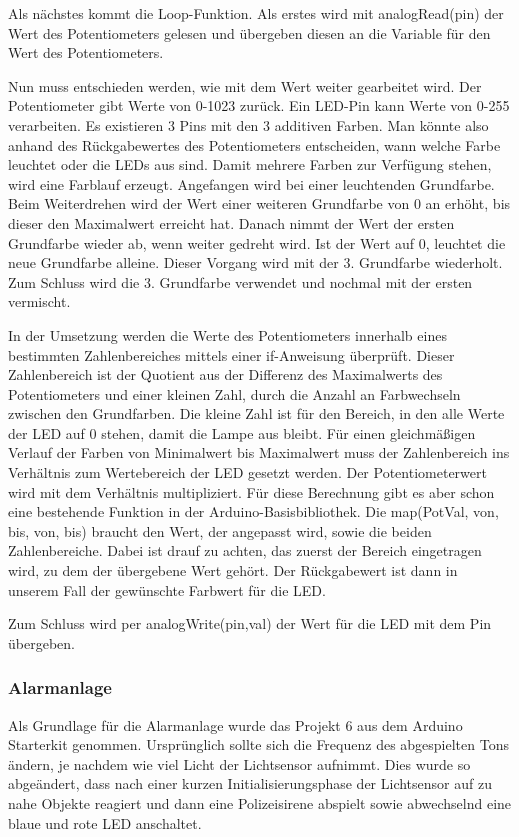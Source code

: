 Als nächstes kommt die Loop-Funktion. Als erstes wird mit analogRead(pin) der Wert des Potentiometers gelesen und übergeben diesen an die Variable für den Wert des Potentiometers.

Nun muss entschieden werden, wie mit dem Wert weiter gearbeitet wird. Der Potentiometer gibt Werte von 0-1023 zurück. Ein LED-Pin kann Werte von 0-255 verarbeiten. Es existieren 3 Pins mit den 3 additiven Farben. Man könnte also anhand des Rückgabewertes des Potentiometers entscheiden, wann welche Farbe leuchtet oder die LEDs aus sind. Damit mehrere Farben zur Verfügung stehen, wird eine Farblauf erzeugt. Angefangen wird bei einer leuchtenden Grundfarbe. Beim Weiterdrehen wird der Wert einer weiteren Grundfarbe von 0 an erhöht, bis dieser den Maximalwert erreicht hat. Danach nimmt der Wert der ersten Grundfarbe wieder ab, wenn weiter gedreht wird. Ist der Wert auf 0, leuchtet die neue Grundfarbe alleine. Dieser Vorgang wird mit der 3. Grundfarbe wiederholt. Zum Schluss wird die 3. Grundfarbe verwendet und nochmal mit der ersten vermischt.

In der Umsetzung werden die Werte des Potentiometers innerhalb eines bestimmten Zahlenbereiches mittels einer if-Anweisung überprüft. Dieser Zahlenbereich ist der Quotient aus der Differenz des Maximalwerts des Potentiometers und einer kleinen Zahl, durch die Anzahl an Farbwechseln zwischen den Grundfarben. Die kleine Zahl ist für den Bereich, in den alle Werte der LED auf 0 stehen, damit die Lampe aus bleibt. Für einen gleichmäßigen Verlauf der Farben von Minimalwert bis Maximalwert muss der Zahlenbereich ins Verhältnis zum Wertebereich der LED gesetzt werden. Der Potentiometerwert wird mit dem Verhältnis multipliziert. Für diese Berechnung gibt es aber schon eine bestehende Funktion in der Arduino-Basisbibliothek. Die map(PotVal, von, bis, von, bis) braucht den Wert, der angepasst wird, sowie die beiden Zahlenbereiche. Dabei ist drauf zu achten, das zuerst der Bereich eingetragen wird, zu dem der übergebene Wert gehört. Der Rückgabewert ist dann in unserem Fall der gewünschte Farbwert für die LED.

Zum Schluss wird per analogWrite(pin,val) der Wert für die LED mit dem Pin übergeben.


\subsubsection{Alarmanlage}
Als Grundlage für die Alarmanlage wurde das Projekt 6 aus dem Arduino Starterkit genommen. Ursprünglich sollte sich die Frequenz des abgespielten Tons ändern, je nachdem wie viel Licht der Lichtsensor aufnimmt. Dies wurde so abgeändert, dass nach einer kurzen Initialisierungsphase der Lichtsensor auf zu nahe Objekte reagiert und dann eine Polizeisirene abspielt sowie abwechselnd eine blaue und rote LED anschaltet.


